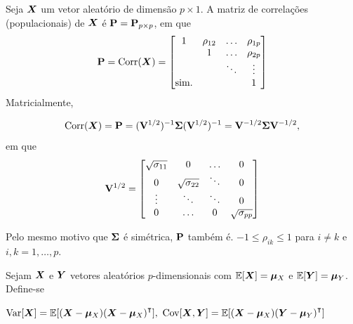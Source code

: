 \begin{definition}
	Seja $\bm{X}$ um vetor aleatório de dimensão $p\times 1$.
	A matriz de correlações (populacionais) de $\bm{X}$ é $\mathbf{P} = \mathbf{P}_{p\times p}$, em que
	\begin{equation}
		\mathbf{P} = \operatorname{Corr}(\bm{X}) =
		\begin{bmatrix}
			1 & \rho_{12} & \ldots & \rho_{1p} \\
			& 1 & \ldots & \rho_{2p} \\
			& & \ddots & \vdots \\
			\text{sim.} & & & 1
		\end{bmatrix}
	\end{equation}
	Matricialmente,
	
	\begin{equation}
		\operatorname{Corr}(\bm{X}) = \mathbf{P} = (\mathbf{V}^{1/2})^{-1}\mathbf{\Sigma}(\mathbf{V}^{1/2})^{-1} 
		= \mathbf{V}^{-1/2}\mathbf{\Sigma}\mathbf{V}^{-1/2},
	\end{equation}
		em que
	\begin{equation}
		\mathbf{V}^{1/2} =
		\begin{bmatrix}
			\sqrt{\sigma_{11}} & 0 & \ldots & 0 \\
			0 & \sqrt{\sigma_{22}} & \ddots & 0 \\
			\vdots & \ddots & \ddots & 0 \\
			0 & \ldots & 0 & \sqrt{\sigma_{pp}}
		\end{bmatrix}
	\end{equation}
	
	\begin{note}
		\leavevmode
		\begin{outline}[enumerate]
			\1 Pelo mesmo motivo que $\mathbf{\Sigma}$ é simétrica, $\mathbf{P}$ também é. 
			\1 $-1\leq \rho_{ik}\leq 1$ para $i\neq k$ e $i,k=1,\ldots,p$.
		\end{outline}
	\end{note}
\end{definition}


\begin{definition}
	Sejam $\bm{X}$ e $\bm{Y}$ vetores aleatórios $p$-dimensionais com $\operatorname{\mathbb{E}}[\bm{X}] = \bm{\mu}_X$ e $\operatorname{\mathbb{E}}[\bm{Y}] = \bm{\mu}_Y$. Define-se
	\begin{outline}[enumerate]
		\1 \( \Var[\v{X}] = \E[(\v{X}-\v{\mu}_X)(\v{X}-\v{\mu}_X)\T], \)
		\1 \( \Cov[\v{X},\v{Y}] = \E[(\v{X}-\v{\mu}_X)(\v{Y}-\v{\mu}_Y)\T] \)
	\end{outline}
\end{definition}

